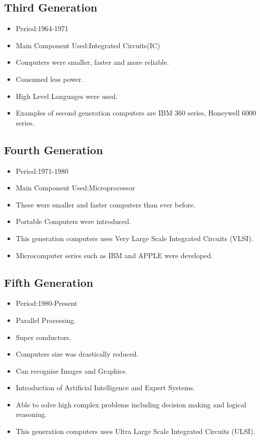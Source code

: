 \documentclass[11pt,a4paper,twoside]{article}
\begin{document}
\subsection{Third Generation}
\begin{itemize}
    \item Period:1964-1971
    \item Main Component Used:Integrated Circuits(IC)
    \item Computers were smaller, faster and more reliable.
    \item Consumed less power.
    \item High Level Languages were used.
    \item Examples of second generation computers are IBM 360 series, Honeywell 6000 series.
\end{itemize}
\subsection{Fourth Generation}
\begin{itemize}
    \item Period:1971-1980
    \item Main Component Used:Microprocessor
    \item These were smaller and faster computers than ever before.
    \item Portable Computers were introduced.
    \item This generation computers uses Very Large Scale Integrated Circuits
(VLSI).
    \item Microcomputer series such as IBM and APPLE were developed.
\end{itemize}
\subsection{Fifth Generation}
\begin{itemize}
    \item Period:1980-Present
    \item Parallel Processing.
    \item Super conductors.
    \item Computers size was drastically reduced.
    \item Can recognise Images and Graphics.
    \item Introduction of Artificial Intelligence and Expert Systems.
    \item Able to solve high complex problems including decision making and logical reasoning.
    \item This generation computers uses Ultra Large Scale Integrated Circuits
(ULSI).
\end{itemize}
\end{document}
